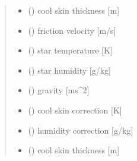 \documentclass[letterpaper,10pt,english]{sphinxmanual}
\begin{document}
\begin{fulllineitems}
\begin{quote}
\begin{description}
\begin{itemize}
\item {}
\sphinxAtStartPar
{} () \textendash{} cool skin thickness           {[}m{]}

\item {}
\sphinxAtStartPar
{} () \textendash{} friction velocity             {[}m/s{]}

\item {}
\sphinxAtStartPar
{} () \textendash{} star temperature              {[}K{]}

\item {}
\sphinxAtStartPar
{} () \textendash{} star humidity                 {[}g/kg{]}

\item {}
\sphinxAtStartPar
{} () \textendash{} gravity                      {[}ms\textasciicircum{}\sphinxhyphen{}2{]}

\end{itemize}

\sphinxAtStartPar
\begin{itemize}
\item {}
\sphinxAtStartPar
{} () \textendash{} cool skin correction         {[}K{]}

\item {}
\sphinxAtStartPar
{} () \textendash{} humidity correction            {[}g/kg{]}

\item {}
\sphinxAtStartPar
{} () \textendash{} cool skin thickness           {[}m{]}

\end{itemize}


\end{description}\end{quote}

\end{fulllineitems}

\end{document}
